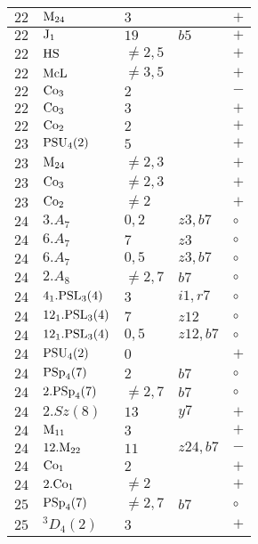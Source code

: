 \documentclass[a4paper, 11pt]{article}
\begin{document}
\begin{longtable}{lllll}
		$22$ & ${\rm M}_{24}$ & $3$ & & $+$ \\ \hline
		$22$ & ${\rm J}_1$ & $19$ & $b5$ & $+$ \\ \hline
		$22$ & ${\rm HS}$ & $\neq 2,5$ & & $+$ \\ \hline
		$22$ & ${\rm McL}$ & $\neq 3,5$ & & $+$ \\ \hline
		$22$ & ${\rm Co}_3$ & $2$ & & $-$ \\ \hline
		$22$ & ${\rm Co}_3$ & $3$ & & $+$ \\ \hline
		$22$ & ${\rm Co}_2$ & $2$ & & $+$ \\ \hline
		$23$ & ${\rm PSU}_{4}(2)$ & $5$ & & $+$ \\ \hline
		$23$ & ${\rm M}_{24}$ & $\neq 2,3$ & & $+$ \\ \hline
		$23$ & ${\rm Co}_3$ & $\neq 2,3$ & & $+$ \\ \hline
		$23$ & ${\rm Co}_2$ & $\neq 2$ & & $+$ \\ \hline
		$24$ & $3.A_{7}$ & $0,2$ & $z3, b7$ & $\circ$ \\ \hline
		$24$ & $6.A_{7}$ & $7$ & $z3$ & $\circ$ \\ \hline
		$24$ & $6.A_{7}$ & $0,5$ & $z3, b7$ & $\circ$ \\ \hline
		$24$ & $2.A_{8}$ & $\neq 2,7$ & $b7$ & $\circ$ \\ \hline
		$24$ & $4_1.{\rm PSL}_{3}(4)$ & $3$ & $i1, r7$ & $\circ$ \\ \hline
		$24$ & $12_1.{\rm PSL}_{3}(4)$ & $7$ & $z12$ & $\circ$ \\ \hline
		$24$ & $12_1.{\rm PSL}_{3}(4)$ & $0,5$ & $z12, b7$ & $\circ$ \\ \hline
		$24$ & ${\rm PSU}_{4}(2)$ & $0$ & & $+$ \\ \hline
		$24$ & ${\rm PSp}_{4}(7)$ & $2$ & $b7$ & $\circ$ \\ \hline
		$24$ & $2.{\rm PSp}_{4}(7)$ & $\neq 2,7$ & $b7$ & $\circ$ \\ \hline
		$24$ & $2.Sz(8)$ & $13$ & $y7$ & $+$ \\ \hline
		$24$ & ${\rm M}_{11}$ & $3$ & & $+$ \\ \hline
		$24$ & $12.{\rm M}_{22}$ & $11$ & $z24, b7$ & $-$ \\ \hline
		$24$ & ${\rm Co}_1$ & $2$ & & $+$ \\ \hline
		$24$ & $2.{\rm Co}_1$ & $\neq 2$ & & $+$ \\ \hline
		$25$ & ${\rm PSp}_{4}(7)$ & $\neq 2,7$ & $b7$ & $\circ$ \\ \hline
		$25$ & ${}^3D_4(2)$ & $3$ & & $+$ \\ \hline

\end{longtable}
\end{document}
